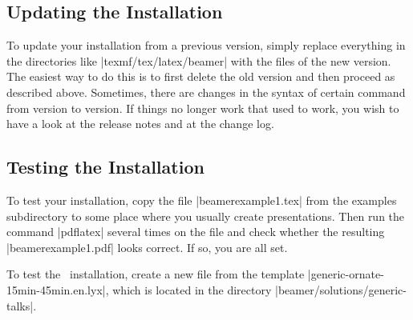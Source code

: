 \subsection{Updating the Installation}

To update your installation from a previous version, simply replace
everything in the directories like |texmf/tex/latex/beamer| with the
files of the new version. The easiest way to do this is to first
delete the old version and then proceed as described above. Sometimes,
there are changes in the syntax of certain command from version to
version. If things no longer work that used to work, you wish to have
a look at the release notes and at the change log.


\subsection{Testing the Installation}

To test your installation, copy the file |beamerexample1.tex|
from the examples subdirectory to some place where you usually
create presentations. Then run the command |pdflatex| several times on
the file and check whether the resulting |beamerexample1.pdf|
looks correct. If so, you are all set.

\lyxnote
To test the \LyX\ installation, create a new file from the
template |generic-ornate-15min-45min.en.lyx|, which is located in the directory
|beamer/solutions/generic-talks|.






